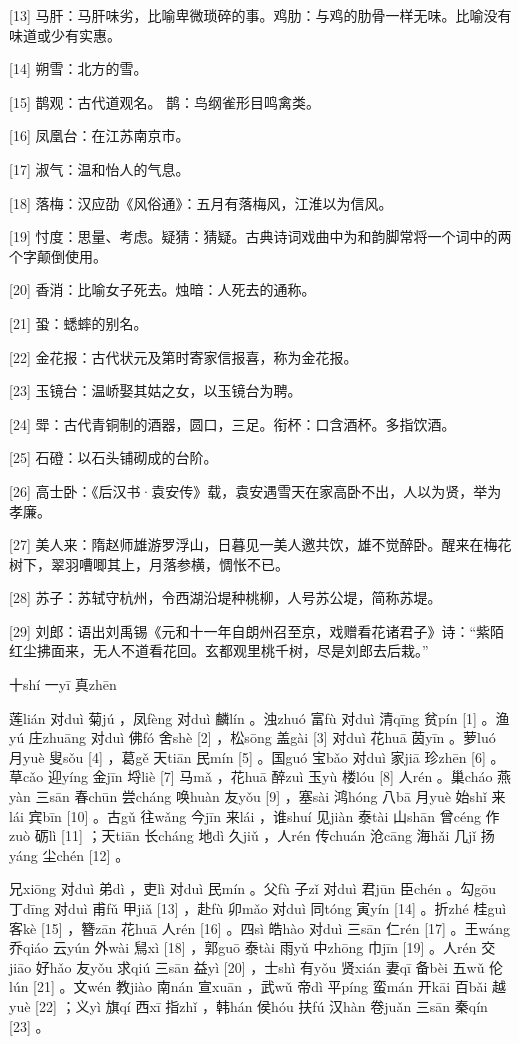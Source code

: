 \documentclass[12pt,UTF8]{ctexbook}
\begin{document}
[13] 马肝：马肝味劣，比喻卑微琐碎的事。鸡肋：与鸡的肋骨一样无味。比喻没有味道或少有实惠。

[14] 朔雪：北方的雪。

[15] 鹊观：古代道观名。 鹊：鸟纲雀形目鸣禽类。

[16] 凤凰台：在江苏南京市。

[17] 淑气：温和怡人的气息。

[18] 落梅：汉应劭《风俗通》：五月有落梅风，江淮以为信风。

[19] 忖度：思量、考虑。疑猜：猜疑。古典诗词戏曲中为和韵脚常将一个词中的两个字颠倒使用。

[20] 香消：比喻女子死去。烛暗：人死去的通称。

[21] 蛩：蟋蟀的别名。

[22] 金花报：古代状元及第时寄家信报喜，称为金花报。

[23] 玉镜台：温峤娶其姑之女，以玉镜台为聘。

[24] 斝：古代青铜制的酒器，圆口，三足。衔杯：口含酒杯。多指饮酒。

[25] 石磴：以石头铺砌成的台阶。

[26] 高士卧：《后汉书·袁安传》载，袁安遇雪天在家高卧不出，人以为贤，举为孝廉。

[27] 美人来：隋赵师雄游罗浮山，日暮见一美人邀共饮，雄不觉醉卧。醒来在梅花树下，翠羽嘈唧其上，月落参横，惆怅不已。

[28] 苏子：苏轼守杭州，令西湖沿堤种桃柳，人号苏公堤，简称苏堤。

[29] 刘郎：语出刘禹锡《元和十一年自朗州召至京，戏赠看花诸君子》诗：“紫陌红尘拂面来，无人不道看花回。玄都观里桃千树，尽是刘郎去后栽。”





十shí 一yī 真zhēn


莲lián 对duì 菊jú ，凤fèng 对duì 麟lín 。浊zhuó 富fù 对duì 清qīng 贫pín [1] 。渔yú 庄zhuāng 对duì 佛fó 舍shè [2] ，松sōng 盖gài [3] 对duì 花huā 茵yīn 。萝luó 月yuè 叟sǒu [4] ，葛gě 天tiān 民mín [5] 。国guó 宝bǎo 对duì 家jiā 珍zhēn [6] 。草cǎo 迎yíng 金jīn 埒liè [7] 马mǎ ，花huā 醉zuì 玉yù 楼lóu [8] 人rén 。巢cháo 燕yàn 三sān 春chūn 尝cháng 唤huàn 友yǒu [9] ，塞sài 鸿hóng 八bā 月yuè 始shǐ 来lái 宾bīn [10] 。古gǔ 往wǎng 今jīn 来lái ，谁shuí 见jiàn 泰tài 山shān 曾céng 作zuò 砺lì [11] ；天tiān 长cháng 地dì 久jiǔ ，人rén 传chuán 沧cāng 海hǎi 几jǐ 扬yáng 尘chén [12] 。

兄xiōng 对duì 弟dì ，吏lì 对duì 民mín 。父fù 子zǐ 对duì 君jūn 臣chén 。勾gōu 丁dīng 对duì 甫fǔ 甲jiǎ [13] ，赴fù 卯mǎo 对duì 同tóng 寅yín [14] 。折zhé 桂guì 客kè [15] ，簪zān 花huā 人rén [16] 。四sì 皓hào 对duì 三sān 仁rén [17] 。王wáng 乔qiáo 云yún 外wài 舃xì [18] ，郭guō 泰tài 雨yǔ 中zhōng 巾jīn [19] 。人rén 交jiāo 好hǎo 友yǒu 求qiú 三sān 益yì [20] ，士shì 有yǒu 贤xián 妻qī 备bèi 五wǔ 伦lún [21] 。文wén 教jiào 南nán 宣xuān ，武wǔ 帝dì 平píng 蛮mán 开kāi 百bǎi 越yuè [22] ；义yì 旗qí 西xī 指zhǐ ，韩hán 侯hóu 扶fú 汉hàn 卷juǎn 三sān 秦qín [23] 。
\end{document}
